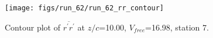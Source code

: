 \begin{figure}[H]
\centering
\texttt{[image: figs/run\_62/run\_62\_rr\_contour]}
\caption{Contour plot of $\overline{r^\prime r^\prime}$ at $z/c$=10.00, $V_{free}$=16.98, station 7.}
\label{fig:run_62_rr_contour}
\end{figure}


